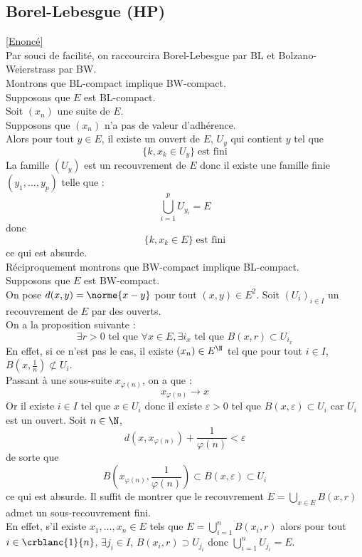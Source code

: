 \documentclass{book}
\begin{document}
	\subsection{Borel-Lebesgue (HP)}
	\label{sec:borel-lebesgue}
	\textcolor{blue}{\hyperref[Borel-Lebesgue]{[Enoncé]}}\\
	Par souci de facilité, on raccourcira Borel-Lebesgue par BL et Bolzano-Weierstrass par BW.\\
	Montrons que BL-compact implique BW-compact.\\
	Supposons que $E$ est BL-compact.\\
	Soit $(x_n)$ une suite de $E$.\\
	Supposons que $(x_n)$ n'a pas de valeur d'adhérence.\\
	Alors pour tout $y\in E$, il existe un ouvert de $E$, $U_y$ qui contient $y$ tel que \[\{k, x_k\in U_y\}\; \text{est fini}\]
	La famille $(U_y)$ est un recouvrement de $E$ donc il existe une famille finie $(y_1,\dots, y_p)$ telle que :
	\[\bigcup_{i=1}^{p}U_{y_i}=E\]
	donc \[\{{k, x_k\in E}\}\; \text{est fini}\]
	ce qui est absurde.\\
	Réciproquement montrons que BW-compact implique BL-compact.\\
	Supposons que $E$ est BW-compact.\\
	On pose $d(x,y)=\norme{x-y}$ pour tout $(x,y)\in E^2$.
	Soit $(U_i)_{i\in I}$ un recouvrement de $E$ par des ouverts.\\
	On a la proposition suivante : \[\exists r>0 \text{ tel que } \forall x\in E, \exists i_x \text{ tel que } B(x,r)\subset U_{i_x}\]
	En effet, si ce n'est pas le cas, il existe $(x_n)\in E^\N$ tel que pour tout $i\in I$, $B\left(x,\frac{1}{n}\right)\not\subset U_{i}$.\\
	Passant à une sous-suite $x_{\varphi(n)}$, on a que : 
	\[x_{\varphi(n)}\to x\]
	Or il existe $i\in I$ tel que $x\in U_i$ donc il existe $\varepsilon >0$ tel que $B(x,\varepsilon)\subset U_i$ car $U_i$ est un ouvert.
	Soit $n\in \N$, \[d(x,x_{\varphi(n)})+\frac{1}{\varphi(n)}<\varepsilon\]
	de sorte que \[B\left(x_{\varphi(n)},\frac{1}{\varphi(n)}\right)\subset B(x,\varepsilon)\subset U_i\]
	ce qui est absurde.
	Il suffit de montrer que le recouvrement $E=\bigcup_{x\in E} B(x,r)$ admet un sous-recouvrement fini.\\
	En effet, s'il existe $x_1,\dots, x_n \in E$ tels que $E=\bigcup_{i=1}^n B(x_i,r)$ alors pour tout $i\in\crblanc{1}{n}$, $\exists j_i\in I$, $B(x_i,r)\supset U_{j_i}$ donc $\bigcup_{i=1}^n U_{j_i}=E$.\\
\end{document}
